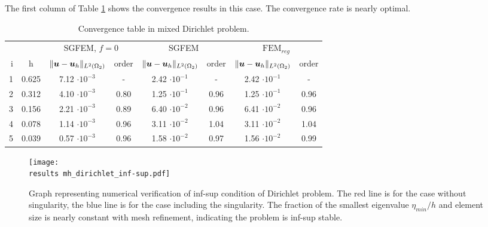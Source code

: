 The first column of Table \ref{tab:convergence_mh_dirichlet} shows the convergence results in this case.
The convergence rate is nearly optimal.
%
\begin{table}[!htb]
\begin{center}
\bgroup
\def\arraystretch{1.2}
\setlength\tabcolsep{5pt}
\begin{tabular}{rc|cc|cc|cc}
\toprule
\multicolumn{2}{c|}{} & \multicolumn{2}{c|}{ SGFEM, $f=0$} & \multicolumn{2}{c|}{SGFEM} & \multicolumn{2}{c}{$\textrm{FEM}_{reg}$}\\ [3pt] %
i & h & $\|\mathbf{\boldsymbol{u}}-\mathbf{\boldsymbol{u}}_h\|_{L^2(\Omega_2)}$ & order & $\|\mathbf{\boldsymbol{u}}-\mathbf{\boldsymbol{u}}_h\|_{L^2(\Omega_2)}$
    & order & $\|\mathbf{\boldsymbol{u}}-\mathbf{\boldsymbol{u}}_h\|_{L^2(\Omega_2)}$ & order \\ [3pt] \midrule
1 & 0.625 &  7.12 $\cdot10^{-3}$  &  -   &  2.42 $\cdot10^{-1}$  &  -   & 2.42 $\cdot10^{-1}$  &   -   \\
2 & 0.312 &  4.10 $\cdot10^{-3}$  & 0.80 &  1.25 $\cdot10^{-1}$  & 0.96 & 1.25 $\cdot10^{-1}$ &  0.96 \\
3 & 0.156 &  2.21 $\cdot10^{-3}$  & 0.89 &  6.40 $\cdot10^{-2}$  & 0.96 & 6.41 $\cdot10^{-2}$ &  0.96 \\
4 & 0.078 &  1.14 $\cdot10^{-3}$  & 0.96 &  3.11 $\cdot10^{-2}$  & 1.04 & 3.11 $\cdot10^{-2}$ &  1.04 \\
5 & 0.039 &  0.57 $\cdot10^{-3}$  & 0.96 &  1.58 $\cdot10^{-2}$  & 0.97 & 1.56 $\cdot10^{-2}$ &  0.99 \\
\bottomrule
\end{tabular}
\caption{Convergence table in mixed Dirichlet problem.}
\label{tab:convergence_mh_dirichlet}
\egroup
\end{center}
\end{table}

%
\begin{figure}[!hb]
    \centering    
    \texttt{[image: \\results mh\_dirichlet\_inf-sup.pdf]} 
    \caption[Numerical verification of inf-sup condition.]
  {Graph representing numerical verification of inf-sup condition of Dirichlet problem.
  The red line is for the case without singularity, the blue line is for the case including the singularity.
  The fraction of the smallest eigenvalue $\eta_{min}/h$ and element size is nearly constant with mesh refinement,
  indicating the problem is inf-sup stable.}
  \label{fig:mh_dirichlet_inf-sup}
\end{figure}
%


